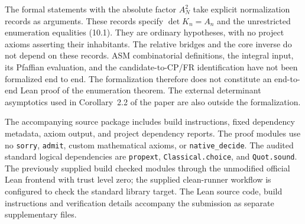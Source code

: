 \documentclass[11pt,a4paper]{article}
\begin{document}
The formal statements with the absolute factor $A_N^2$ take explicit normalization records as arguments. These records specify $\det K_n=A_n$ and the unrestricted enumeration equalities (10.1). They are ordinary hypotheses, with no project axioms asserting their inhabitants. The relative bridges and the core inverse do not depend on these records. ASM combinatorial definitions, the integral input, its Pfaffian evaluation, and the candidate-to-CP/FR identification have not been formalized end to end. The formalization therefore does not constitute an end-to-end Lean proof of the enumeration theorem. The external determinant asymptotics used in Corollary~2.2 of the paper are also outside the formalization.

The accompanying source package includes build instructions, fixed dependency metadata, axiom output, and project dependency reports. The proof modules use no \texttt{sorry}, \texttt{admit}, custom mathematical axioms, or \texttt{native\_decide}. The audited standard logical dependencies are \texttt{propext}, \texttt{Classical.choice}, and \texttt{Quot.sound}. The previously supplied build checked modules through the unmodified official Lean frontend with trust level zero; the supplied clean-runner workflow is configured to check the standard library target. The Lean source code, build instructions and verification details accompany the submission as separate supplementary files.
\end{document}
